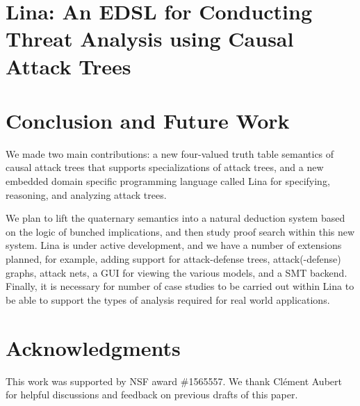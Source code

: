 \documentclass{llncs}
\begin{document}
\vspace{-7px}
\section{Lina: An EDSL for Conducting Threat Analysis using Causal Attack Trees}
\label{sec:lina:_an_edsl_for_conducting_threat_analysis_using_causal_attack_trees}


\vspace{-7px}
\section{Conclusion and Future Work}
\label{sec:conclusion}
We made two main contributions: a new four-valued truth table
semantics of causal attack trees that supports specializations of
attack trees, and a new embedded domain specific programming language
called Lina for specifying, reasoning, and analyzing attack trees.

We plan to lift the quaternary semantics into a natural deduction
system based on the logic of bunched implications, and then study
proof search within this new system.  Lina is under active
development, and we have a number of extensions planned, for example,
adding support for attack-defense trees, attack(-defense) graphs,
attack nets, a GUI for viewing the various models, and a SMT backend.
Finally, it is necessary for number of case studies to be carried out
within Lina to be able to support the types of analysis required for
real world applications.  

\vspace{-7px}
\section{Acknowledgments}
\label{sec:acknowledgments}
This work was supported by NSF award \#1565557.  We thank Cl\'ement
Aubert for helpful discussions and feedback on previous drafts of this
paper.





\appendix
\end{document}
